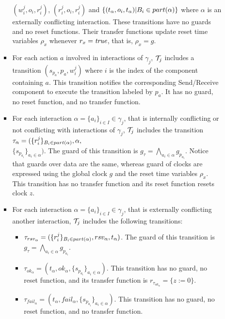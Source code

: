 \begin{definition}[Scheduler]
\begin{itemize}
\begin{itemize}
\begin{itemize}
              $(w_i^j,o_i,r_i^j)$, $(r_i^j,o_i,r_i^j)$ and $\{(t_{\alpha},o_i,t_{\alpha})|
              B_i\in part(\alpha)\}$ where $\alpha$ is an externally conflicting interaction.
              These transitions have no guards and no reset functions. 
              Their transfer functions update reset time 
              variables $\rho_x$ whenever $r_x=\textnormal{\textit{true}}$, that is, $\rho_x=g$. 
            \item For each action $a$ involved in interactions of $\gamma_j$, $\mathcal{T}_j$ includes
              a transition $(s_{p_a},p_a,w_i^j)$ where $i$ is the index of the component
              containing $a$. This transition notifies the corresponding Send/Receive component 
              to execute the transition labeled by $p_a$. It has no guard, no reset function,
              and no transfer function.
            \item For each interaction $\alpha=\{a_i\}_{i\in{I}}\in\gamma_j$, that is 
              internally conflicting or not conflicting with interactions of $\gamma_j$,
              $\mathcal{T}_j$ includes the transition $\tau_{\alpha}=(\{r_i^j\}_{B_i\in part(\alpha)},
              \alpha,$\\$\{s_{p_{a_i}}\}_{a_i\in\alpha})$. The guard of this transition is 
              $g_{\tau}=
              \bigwedge_{a_i\in\alpha}g_{p_{a_i}}$. Notice that guards over data are the same,
              whereas guard of clocks are expressed using the global clock $g$ and the reset
              time variables $\rho_x$. This transition has no transfer function 
              and its reset function resets clock $z$.
            \item For each interaction $\alpha=\{a_i\}_{i\in{I}}\in\gamma_j$, that is 
              externally conflicting another interaction,
              $\mathcal{T}_j$ includes the following transitions:
              \begin{itemize}
                \item $\tau_{rsv_{\alpha}}=(\{r_i^j\}_{B_i\in part(\alpha)},rsv_{\alpha},t_{\alpha}
                  )$. The guard of this transition is $g_{\tau}=\bigwedge_{a_i\in\alpha}
                  g_{p_{a_i}}$.
                \item $\tau_{ok_{\alpha}}=(t_{\alpha},ok_{\alpha},\{s_{p_{a_i}}\}_{a_i\in\alpha})
                  $. This transition has no guard, no reset function, and its transfer function is
                   $r_{\tau_{ok_{\alpha}}}=\{z:=0\}$.
                \item $\tau_{fail_{\alpha}}=(t_{\alpha},fail_{\alpha},\{s_{p_{a_i}}\}_{a_i
                  \in\alpha})$. This transition has no guard, no reset function, and no 
                  transfer function.
              \end{itemize}
          \end{itemize}
      \end{itemize}
  \end{itemize}
\end{definition}
